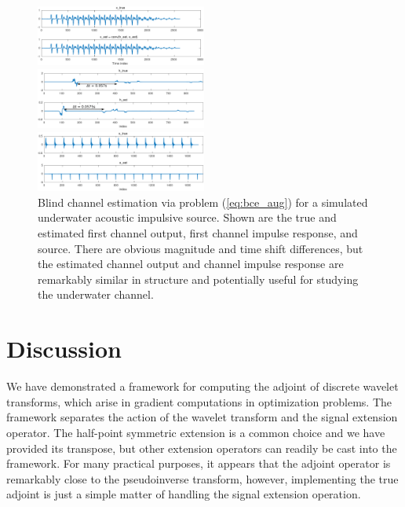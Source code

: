 \documentclass[journal]{IEEEtran}
\begin{document}
\begin{figure}
   \centering
   \includegraphics[width=0.5\textwidth]{figures/bce_rec_004_x.pdf}
   
   \includegraphics[width=0.5\textwidth]{figures/bce_rec_004_h_annotated.pdf}
   
   \includegraphics[width=0.5\textwidth]{figures/bce_rec_004_s.pdf}
   \caption{Blind channel estimation via problem (\ref{eq:bce_aug}) for a simulated underwater acoustic impulsive source.  Shown are the true and estimated first channel output, first channel impulse response, and source.  There are obvious magnitude and time shift differences, but the estimated channel output and channel impulse response are remarkably similar in structure and potentially useful for studying the underwater channel.}
   \label{fig:bce_rec}
\end{figure}



\section{Discussion}
We have demonstrated a framework for computing the adjoint of discrete wavelet transforms, which arise in gradient computations in optimization problems.  The framework separates the action of the wavelet transform and the signal extension operator.  The half-point symmetric extension is a common choice and we have provided its transpose, but other extension operators can readily be cast into the framework.  For many practical purposes, it appears that the adjoint operator is remarkably close to the pseudoinverse transform, however, implementing the true adjoint is just a simple matter of handling the signal extension operation.
\end{document}
